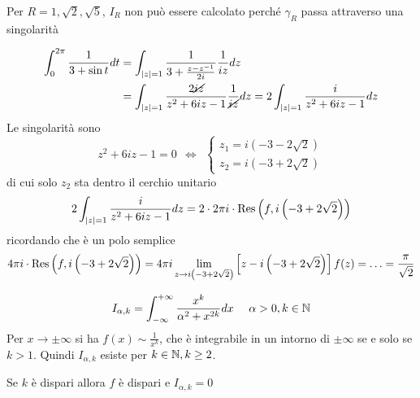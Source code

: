 Per $R = 1, \sqrt{2}, \sqrt{5}$, $I_{R}$ non può essere calcolato perché $\gamma_{R}$ passa attraverso una singolarità

\Soluzione

\begin{align*}
\int^{2\pi}_{0}\frac{1}{3 + \sin t} dt & = \int_{\left| z\right| = 1}\frac{1}{3 + \frac{z - z^{- 1}}{2i}}\frac{1}{iz} dz\\
 & = \int_{\left| z\right| = 1}\frac{2\cancel{iz}}{z^{2} + 6iz - 1}\frac{1}{\cancel{iz}} dz = 2\int_{\left| z\right| = 1}\frac{i}{z^{2} + 6iz - 1} dz
\end{align*}
Le singolarità sono
\begin{equation*}
z^{2} + 6iz - 1 = 0\ \ \iff \ \
\begin{cases}
z_{1} = i\left(- 3 - 2\sqrt{2}\right)\\
z_{2} = i\left(- 3 + 2\sqrt{2}\right)
\end{cases}
\end{equation*}
di cui solo $z_{2}$ sta dentro il cerchio unitario
\begin{equation*}
2\int_{\left| z\right| = 1}\frac{i}{z^{2} + 6iz - 1} dz = 2 \cdot 2\pi i \cdot \operatorname{Res} \left(f, i\left(- 3 + 2\sqrt{2}\right)\right)
\end{equation*}
ricordando che è un polo semplice
\begin{equation*}
4\pi i \cdot \operatorname{Res} \left(f, i\left(- 3 + 2\sqrt{2}\right)\right) = 4\pi i\lim\limits_{z\rightarrow i\left(- 3 + 2\sqrt{2}\right)}\left[ z - i\left(- 3 + 2\sqrt{2}\right)\right] f(z) = \dotsc = \frac{\pi}{\sqrt{2}}
\end{equation*}

\Soluzione

\begin{equation*}
I_{\alpha, k} = \int^{+ \infty}_{- \infty}\frac{x^{k}}{\alpha^{2} + x^{2k}} dx\ \ \ \ \alpha > 0, k\in \mathbb{N}
\end{equation*}
Per $x\rightarrow \pm \infty $ si ha $f(x) \sim \frac{1}{x^{k}}$, che è integrabile in un intorno di $\pm \infty $ se e solo se $k > 1$. Quindi $I_{\alpha, k}$ esiste per $k\in \mathbb{N}, k \geq 2$.

Se $k$ è dispari allora $f$ è dispari e $I_{\alpha, k} = 0$

